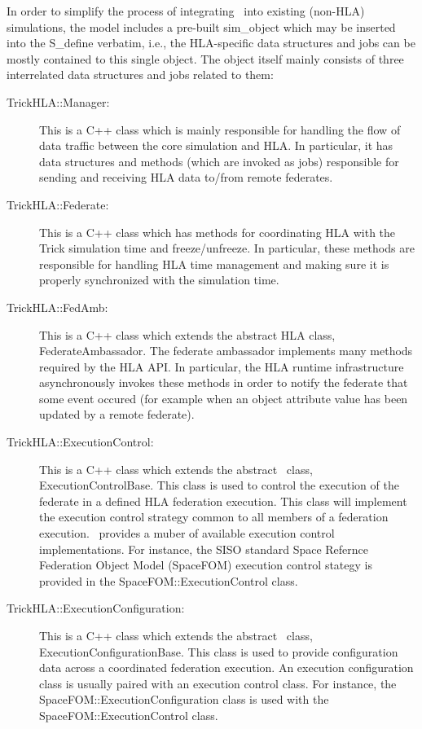 In order to simplify the process of integrating \TrickHLA\ into existing (non-HLA)
simulations,
the model includes a pre-built {\ttfamily sim\_object} which may be inserted into
the {\ttfamily S\_define} verbatim, 
i.e., the HLA-specific data structures and jobs can be mostly contained to this
single object.
The object itself mainly consists of three interrelated data structures and jobs 
related to them:
%
\begin{description}
  \item[TrickHLA::Manager:]{
    This is a C++ class which is mainly responsible for handling the flow of data traffic
    between the core simulation and HLA.
    In particular, it has data structures and methods (which are invoked as jobs)
    responsible for sending and receiving HLA data to/from remote federates.
  }
  \item[TrickHLA::Federate:]{
    This is a C++ class which has methods for coordinating HLA with the Trick
    simulation time and freeze/unfreeze.
    In particular, these methods are responsible for handling HLA time management
    and making sure it is properly synchronized with the simulation time.
  }
  \item[TrickHLA::FedAmb:]{
    This is a C++ class which extends the abstract HLA class,
    {\ttfamily FederateAmbassador}.
    The federate ambassador implements many methods required by the HLA API.
    In particular, the HLA runtime infrastructure asynchronously invokes these methods
    in order to notify the federate that some event occured
    (for example when an object attribute value has been updated by a remote federate).
  }
  \item[TrickHLA::ExecutionControl:]{
    This is a C++ class which extends the abstract \TrickHLA\ class,
    {\ttfamily ExecutionControlBase}.
    This class is used to control the execution of the federate in a defined
    HLA federation execution. This class will implement the execution
    control strategy common to all members of a federation execution.
    \TrickHLA\ provides a muber of available execution control implementations.
    For instance, the SISO standard Space Refernce Federation Object Model
    (SpaceFOM) execution control stategy is provided in the
    {\ttfamily SpaceFOM::ExecutionControl} class.
    
  }
  \item[TrickHLA::ExecutionConfiguration:]{
    This is a C++ class which extends the abstract \TrickHLA\ class,
    {\ttfamily ExecutionConfigurationBase}.
    This class is used to provide configuration data across a coordinated
    federation execution. An execution configuration class is usually paired
    with an execution control class. For instance, the
    {\ttfamily SpaceFOM::ExecutionConfiguration} class is used with the
    {\ttfamily SpaceFOM::ExecutionControl} class.
  }
\end{description}

